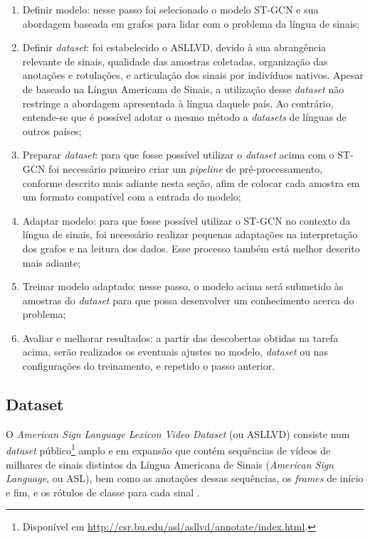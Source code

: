 \begin{enumerate}
    \item Definir modelo: nesse passo foi selecionado o modelo ST-GCN e sua abordagem baseada em grafos para lidar com o problema da língua de sinais;
    \item Definir \textit{dataset}: foi estabelecido o ASLLVD, devido à sua abrangência relevante de sinais, qualidade das amostras coletadas, organização das anotações e rotulações, e articulação dos sinais por indivíduos nativos. Apesar de baseado na Língua Americana de Sinais, a utilização desse \textit{dataset} não restringe a abordagem apresentada à língua daquele país. Ao contrário, entende-se que é possível adotar o mesmo método a \textit{datasets} de línguas de outros países;
    \item Preparar \textit{dataset}: para que fosse possível utilizar o \textit{dataset} acima com o ST-GCN foi necessário primeiro criar um \textit{pipeline} de pré-processamento, conforme descrito mais adiante nesta seção, afim de colocar cada amostra em  um formato compatível com a entrada do modelo;
    \item Adaptar modelo: para que fosse possível utilizar o ST-GCN no contexto da língua de sinais, foi necessário realizar pequenas adaptações na interpretação dos grafos e na leitura dos dados. Esse processo também está melhor descrito mais adiante;
    \item Treinar modelo adaptado: nesse passo, o modelo acima será submetido às amostras do \textit{dataset} para que possa desenvolver um conhecimento acerca do problema;
    \item Avaliar e melhorar resultados: a partir das descobertas obtidas na tarefa acima, serão realizados os eventuais ajustes no modelo, \textit{dataset} ou nas configurações do treinamento, e repetido o passo anterior.
\end{enumerate}


\subsection{Dataset} %
\label{sec:dataset}

O \textit{American Sign Language Lexicon Video Dataset} (ou ASLLVD) consiste num \textit{dataset} público\footnote{
    Disponível em \url{http://csr.bu.edu/asl/asllvd/annotate/index.html}.
} amplo e em expansão que contém sequências de vídeos de milhares de sinais distintos da Língua Americana de Sinais (\textit{American Sign Language}, ou ASL), bem como as anotações dessas sequências, os \textit{frames} de início e fim, e os rótulos de classe para cada sinal \cite{athitsos-asllvd-2008, neidle-2012, vloger-2012}.

